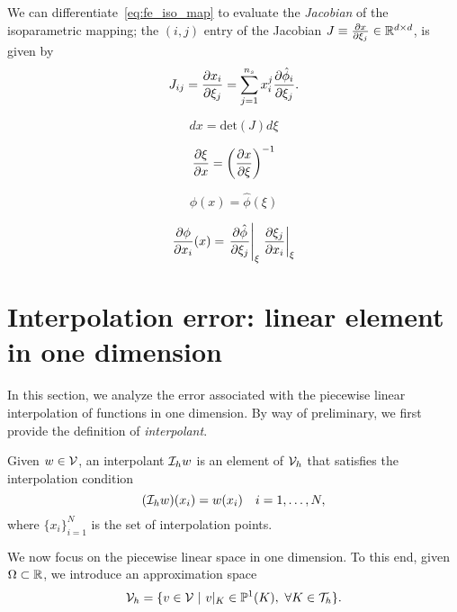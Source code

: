 We can differentiate~\eqref{eq:fe_iso_map} to evaluate the \emph{Jacobian} of the isoparametric mapping; the $(i,j)$ entry of the Jacobian $J \equiv \frac{\partial x}{\partial \xi_j} \in \mathbb{R}^{d \times d}$, is given by
\begin{equation*}
  J_{ij} = \frac{\partial x_i}{\partial \xi_j} = \sum_{j=1}^{n_s} x^j_i \frac{\partial \hat \phi_i}{\partial \xi_j} .
\end{equation*}

\begin{equation*}
  dx = \text{det}(J) d\xi
\end{equation*}

\begin{equation*}
  \frac{\partial \xi}{\partial x} = \left( \frac{\partial x}{\partial \xi} \right)^{-1}
\end{equation*}

\begin{equation*}
  \phi(x) = \hat \phi (\xi)
\end{equation*}

\begin{equation*}
  \frac{\partial \phi}{\partial x_i}(x) = \left. \frac{\partial \hat \phi}{\partial \xi_j} \right|_\xi  \left. \frac{\partial \xi_j}{\partial x_i} \right|_\xi
\end{equation*}


\section{Interpolation error: linear element in one dimension}
\label{sec:fe_interp_1d}
In this section, we analyze the error associated with the piecewise linear interpolation of functions in one dimension. By way of preliminary, we first provide the definition of \emph{interpolant}.
\begin{definition}[interpolant]
Given $w \in \mathcal{V}$, an interpolant $\mathcal{I}_h w$ is an element of $\mathcal{V}_h$ that satisfies the interpolation condition
\begin{equation*}
  (\mathcal{I}_h w)(x_i) = w(x_i) \quad i = 1,\dots, N,
\end{equation*}
where $\{x_i \}_{i=1}^N$ is the set of interpolation points.
\end{definition}

We now focus on the piecewise linear space in one dimension.  To this end, given $\Omega \subset \mathbb{R}$, we introduce an approximation space
\begin{equation*}
  \mathcal{V}_h = \{ v \in \mathcal{V} \ | \ v|_K \in \mathbb{P}^1(K), \ \forall K \in \mathcal{T}_h \}.
\end{equation*}

